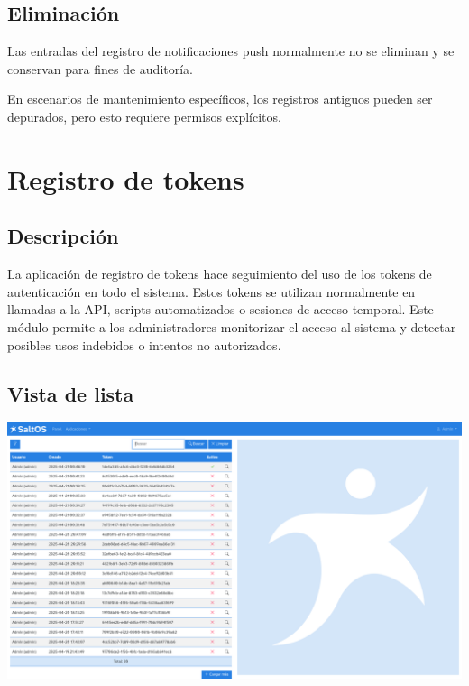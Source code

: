 \documentclass[a4paper]{article}
\begin{document}
\hypertarget{toc25}{}
\subsection{Eliminación}

Las entradas del registro de notificaciones push normalmente no se eliminan y se conservan para fines de auditoría.

En escenarios de mantenimiento específicos, los registros antiguos pueden ser depurados, pero esto requiere permisos explícitos.


\hypertarget{toc26}{}
\section{Registro de tokens}

\hypertarget{toc27}{}
\subsection{Descripción}

La aplicación de registro de tokens hace seguimiento del uso de los tokens de autenticación en todo el sistema.
Estos tokens se utilizan normalmente en llamadas a la API, scripts automatizados o sesiones de acceso temporal.
Este módulo permite a los administradores monitorizar el acceso al sistema y detectar posibles usos indebidos o intentos no autorizados.

\hypertarget{toc28}{}
\subsection{Vista de lista}

\begin{center}\includegraphics[width=1\textwidth]{../ujest/snaps/test-screenshots-js-screenshots-common-tokenslog-list-es-es-1-snap.png}\end{center}
\end{document}
